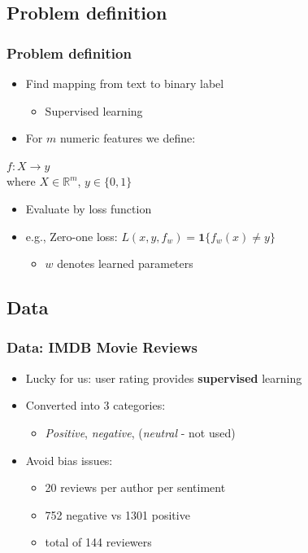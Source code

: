 \documentclass{beamer}
\begin{document}
\subsection{Problem definition}
\begin{frame}
	\frametitle{Problem definition}
	\begin{itemize}
		\item Find mapping from text to binary label \pause
		\begin{itemize}
			\item Supervised learning
		\end{itemize} \pause
		\item For $m$ numeric features we define:
	\end{itemize}
	\pause
	\begin{definition}
		\center
		$f: X \to y$ \\
		where $X \in \mathbb{R}^{m}$, $y \in \{0,1\}$
	\end{definition}
	\pause
	\begin{itemize}
		\item Evaluate by loss function \pause
		\item e.g., Zero-one loss: $L(x,y,f_w)=\textbf{1}\{ f_w(x) \neq y \}$
		\begin{itemize}
			\item $w$ denotes learned parameters
		\end{itemize}
	\end{itemize}
\end{frame}

\subsection{Data}

\begin{frame}
	\frametitle{Data: IMDB Movie Reviews}
	\begin{itemize}
		\item Lucky for us: user rating provides \textbf{supervised} learning
		\item Converted into 3 categories:
		\begin{itemize}
			\item \emph{Positive}, \emph{negative}, (\emph{neutral} - not used)
		\end{itemize}
		\item Avoid bias issues:
		\begin{itemize}
			\item 20 reviews per author per sentiment
			\item 752 negative vs 1301 positive
			\item total of 144 reviewers
		\end{itemize}
	\end{itemize}
\end{frame}
\end{document}
